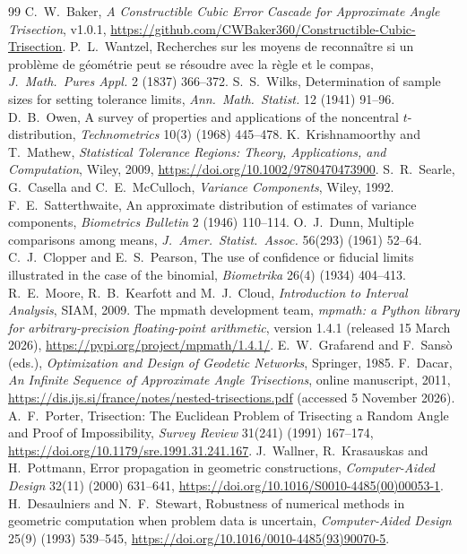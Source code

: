 \documentclass[11pt]{article}
\theoremstyle{definition}
\begin{document}
\begin{thebibliography}{99}
 C.~W.~Baker, \emph{A Constructible Cubic Error Cascade for Approximate Angle Trisection}, v1.0.1, \url{https://github.com/CWBaker360/Constructible-Cubic-Trisection}.
 P.~L.~Wantzel, Recherches sur les moyens de reconna\^itre si un probl\`eme de g\'eom\'etrie peut se r\'esoudre avec la r\`egle et le compas, \emph{J.\ Math.\ Pures Appl.} 2 (1837) 366--372.
 S.~S.~Wilks, Determination of sample sizes for setting tolerance limits, \emph{Ann.\ Math.\ Statist.} 12 (1941) 91--96.
 D.~B.~Owen, A survey of properties and applications of the noncentral $t$-distribution, \emph{Technometrics} 10(3) (1968) 445--478.
 K.~Krishnamoorthy and T.~Mathew, \emph{Statistical Tolerance Regions: Theory, Applications, and Computation}, Wiley, 2009, \url{https://doi.org/10.1002/9780470473900}.
 S.~R.~Searle, G.~Casella and C.~E.~McCulloch, \emph{Variance Components}, Wiley, 1992.
 F.~E.~Satterthwaite, An approximate distribution of estimates of variance components, \emph{Biometrics Bulletin} 2 (1946) 110--114.
 O.~J.~Dunn, Multiple comparisons among means, \emph{J.\ Amer.\ Statist.\ Assoc.} 56(293) (1961) 52--64.
 C.~J.~Clopper and E.~S.~Pearson, The use of confidence or fiducial limits illustrated in the case of the binomial, \emph{Biometrika} 26(4) (1934) 404--413.
 R.~E.~Moore, R.~B.~Kearfott and M.~J.~Cloud, \emph{Introduction to Interval Analysis}, SIAM, 2009.
 The mpmath development team, \emph{mpmath: a Python library for arbitrary-precision floating-point arithmetic}, version 1.4.1 (released 15 March 2026), \url{https://pypi.org/project/mpmath/1.4.1/}.
 E.~W.~Grafarend and F.~Sans\`o (eds.), \emph{Optimization and Design of Geodetic Networks}, Springer, 1985.
 F.~Dacar, \emph{An Infinite Sequence of Approximate Angle Trisections}, online manuscript, 2011, \url{https://dis.ijs.si/france/notes/nested-trisections.pdf} (accessed 5 November 2026).
 A.~F.~Porter, Trisection: The Euclidean Problem of Trisecting a Random Angle and Proof of Impossibility, \emph{Survey Review} 31(241) (1991) 167--174, \url{https://doi.org/10.1179/sre.1991.31.241.167}.
 J.~Wallner, R.~Krasauskas and H.~Pottmann, Error propagation in geometric constructions, \emph{Computer-Aided Design} 32(11) (2000) 631--641, \url{https://doi.org/10.1016/S0010-4485(00)00053-1}.
 H.~Desaulniers and N.~F.~Stewart, Robustness of numerical methods in geometric computation when problem data is uncertain, \emph{Computer-Aided Design} 25(9) (1993) 539--545, \url{https://doi.org/10.1016/0010-4485(93)90070-5}.
\end{thebibliography}
\end{document}
